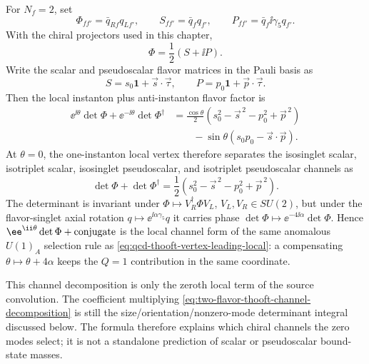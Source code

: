 \begin{proposition}
\label{prop:two-flavor-thooft-channel-decomposition}
For \(N_f=2\), set
\[
  \Phi_{ff'}=\bar q_{Rf}q_{Lf'},\qquad
  S_{ff'}=\bar q_fq_{f'},\qquad
  P_{ff'}=\bar q_f\ii\gamma_5q_{f'} .
\]
With the chiral projectors used in this chapter,
\begin{equation}
  \Phi=\frac12(S+\ii P).
  \label{eq:two-flavor-chiral-bilinear-matrix}
\end{equation}
Write the scalar and pseudoscalar flavor matrices in the Pauli basis as
\[
  S=s_0\mathbf 1+\vec s\cdot\vec\tau,\qquad
  P=p_0\mathbf 1+\vec p\cdot\vec\tau .
\]
Then the local instanton plus anti-instanton flavor factor is
\begin{equation}
\begin{aligned}
  \ee^{\ii\theta}\det\Phi
  +\ee^{-\ii\theta}\det\Phi^\dagger
  &=
  \frac{\cos\theta}{2}
  \left(s_0^2-\vec s^{\,2}-p_0^2+\vec p^{\,2}\right) \\
  &\qquad
  -\sin\theta\left(s_0p_0-\vec s\cdot\vec p\right).
\end{aligned}
  \label{eq:two-flavor-thooft-channel-decomposition}
\end{equation}
At \(\theta=0\), the one-instanton local vertex therefore separates the
isosinglet scalar, isotriplet scalar, isosinglet pseudoscalar, and isotriplet
pseudoscalar channels as
\begin{equation}
  \det\Phi+\det\Phi^\dagger
  =
  \frac12
  \left(s_0^2-\vec s^{\,2}-p_0^2+\vec p^{\,2}\right).
  \label{eq:two-flavor-thooft-theta-zero-channels}
\end{equation}
The determinant is invariant under
\(\Phi\mapsto V_R^\dagger\Phi V_L\), \(V_L,V_R\in SU(2)\), but under the
flavor-singlet axial rotation \(q\mapsto\ee^{\ii\alpha\gamma_5}q\) it carries
phase \(\det\Phi\mapsto\ee^{-4\ii\alpha}\det\Phi\).  Hence
\(\ee^{\ii\theta}\det\Phi+\hbox{\rm conjugate}\) is the local channel form of
the same anomalous \(U(1)_A\) selection rule as
\eqref{eq:qcd-thooft-vertex-leading-local}: a compensating
\(\theta\mapsto\theta+4\alpha\) keeps the \(Q=1\) contribution in the same
coordinate.

This channel decomposition is only the zeroth local term of the source
convolution.  The coefficient multiplying
\eqref{eq:two-flavor-thooft-channel-decomposition} is still the
size/orientation/nonzero-mode determinant integral discussed below.  The formula
therefore explains which chiral channels the zero modes select; it is not a
standalone prediction of scalar or pseudoscalar bound-state masses.
\end{proposition}

